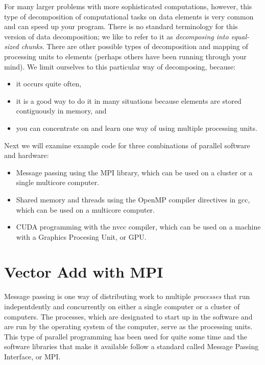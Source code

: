 \documentclass[letterpaper,10pt,openany,oneside]{sphinxmanual}
\begin{document}
For many larger problems with more sophisticated computations, however, this type of decomposition of computational tasks on data elements is very common and can speed up your program.  There is no standard terminology for this version of data decomposition; we like to refer to it as \emph{decomposing into equal-sized chunks}.  There are other possible types of decomposition and mapping of processing units to elements (perhaps others have been running through your mind). We limit ourselves to this particular way of decomposing, because:
\begin{itemize}
\item {} 
it occurs quite often,

\item {} 
it is a good way to do it in many situations because elements are stored contiguously in memory, and

\item {} 
you can concentrate on and learn one way of using multiple processing units.

\end{itemize}

Next we will examine example code for three combinations of parallel software and hardware:
\begin{itemize}
\item {} 
Message passing using the MPI library, which can be used on a cluster or a single multicore computer.

\item {} 
Shared memory and threads using the OpenMP compiler directives in gcc, which can be used on a multicore computer.

\item {} 
CUDA programming with the nvcc compiler, which can be used on a machine with a Graphics Procesing Unit, or GPU.

\end{itemize}


\chapter{Vector Add with MPI}
\label{Decomposition/MPI_VecAdd:vector-add-with-mpi}\label{Decomposition/MPI_VecAdd::doc}
Message passing is one way of distributing work to multiple \emph{processes} that run indepentdently and concurrently on either a single computer or a cluster of computers. The processes, which are designated to start up in the software and are run by the operating system of the computer, serve as the processing units. This type of parallel programming has been used for quite some time and the software libraries that make it available follow a standard called Message Passing Interface, or MPI.
\end{document}

